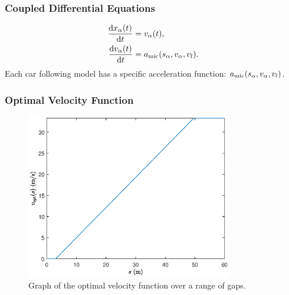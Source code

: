 \documentclass{beamer}
\begin{document}
\begin{frame}
  \frametitle{Coupled Differential Equations}
  \begin{align*} 
    \odv{x_\alpha(t)}{t} &= v_\alpha (t), \\
    \odv{v_\alpha (t)}{t} &= a_{\rm mic} (s_\alpha, v_\alpha, v_l).
  \end{align*}
  Each car following model has a specific acceleration function: $a_{\rm mic} (s_\alpha, v_\alpha, v_l)$.
\end{frame}


\begin{frame}
  \frametitle{Optimal Velocity Function}
  \begin{figure}[H]
    \includegraphics[width=9cm]{vopt_versus_s.eps}
    \centering
    \caption{Graph of the optimal velocity function over a range of gaps.}
\end{figure}
\end{frame}
\end{document}
